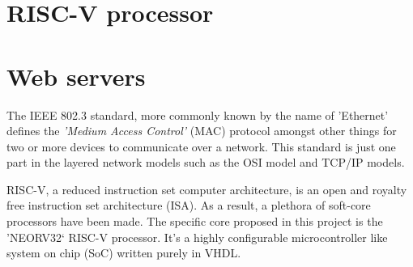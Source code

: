 \section{RISC-V processor}



\section{Web servers}






The IEEE 802.3 standard\cite{IEEE802.3-2012}, more commonly known by the name of 'Ethernet' defines the \textit{'Medium Access Control'} (MAC) 
protocol amongst other things for two or more devices to communicate over a network. This standard is just one part in the layered network 
models such as the OSI model and TCP/IP models. 


RISC-V, a reduced instruction set computer architecture, is an open and royalty free instruction set architecture (ISA). As a result, a plethora 
of soft-core processors have been made. The specific core proposed in this project is the 'NEORV32` RISC-V processor. It's a highly configurable 
microcontroller like system on chip (SoC) written purely in VHDL.


